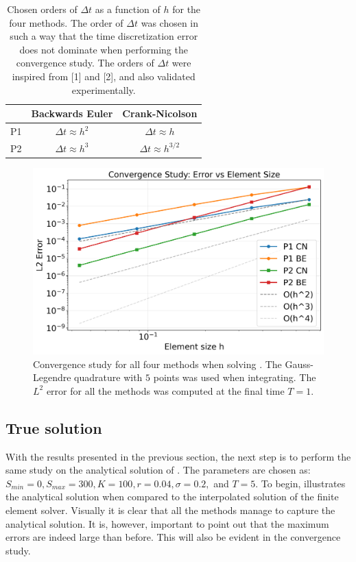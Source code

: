 \documentclass{article}
\begin{document}
\begin{table}[h!]
\centering
\begin{tabular}{|c|c|c|}
\hline
 & Backwards Euler & Crank-Nicolson \\
\hline
P1 & $\Delta t \approx h^2$ & $\Delta t \approx h$ \\
\hline
P2 & $\Delta t \approx h^3$ & $\Delta t \approx h^{3/2}$ \\
\hline
\end{tabular}
\caption{Chosen orders of $\Delta t$ as a function of $h$ for the four methods. The order of $\Delta t$ was chosen in such a way that the time discretization error does not dominate when performing the convergence study. The orders of $\Delta t$ were inspired from [1] and [2], and also validated experimentally.}
\label{tab:orders}
\end{table}




\begin{figure}[!ht]
    \centering
    \includegraphics[width=0.7\linewidth]{code/images/convergence_study_BlackScholesConstructedCos.png}
    \caption{Convergence study for all four methods when solving . The Gauss-Legendre quadrature with $5$ points was used when integrating. The $L^2$ error for all the methods was computed at the final time $T = 1$.}
    \label{fig:conv_cos}
\end{figure}

\subsection{True solution}\label{sec:true_sol}
With the results presented in the previous section, the next step is to perform the same study on the analytical solution of . The parameters are chosen as: $S_{min}=0, S_{max}=300, K=100, r=0.04, \sigma =0.2, $ and $T = 5$. To begin,  illustrates the analytical solution when compared to the interpolated solution of the finite element solver. Visually it is clear that all the methods manage to capture the analytical solution. It is, however, important to point out that the maximum errors are indeed large than before. This will also be evident in the convergence study. 
\end{document}
